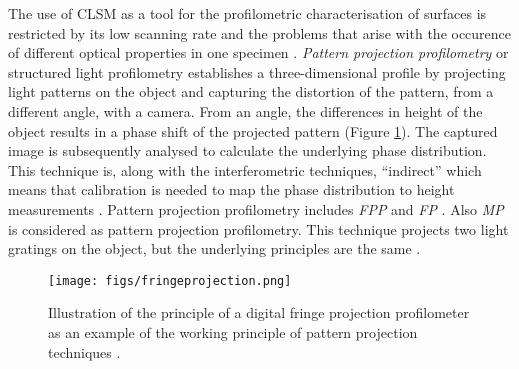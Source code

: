   The use of \gls{CLSM} as a tool for the profilometric characterisation of surfaces is restricted by its low scanning rate and the problems that arise with the occurence of different optical properties in one specimen \citep{Cha2000}.  %
\emph{Pattern projection profilometry} or structured light profilometry establishes a three-dimensional profile by projecting light patterns on the object and capturing the distortion of the pattern, from a different angle, with a camera. From an angle, the differences in height of the object results in a phase shift of the projected pattern (Figure \ref{ZHanger}). The captured image is subsequently analysed to calculate the underlying phase distribution. This technique is, along with the interferometric techniques, ``indirect'' which means that calibration is needed to map the phase distribution to height measurements \citep{Gorthi2010}. 
Pattern projection profilometry includes \emph{\gls{FPP}} \citep{Zhang2010} and \emph{\gls{FP}} \citep{Su2001}. Also \emph{\gls{MP}} is considered as pattern projection profilometry. This technique projects two light gratings on the object, but the underlying principles are the same \citep{moire}.
\begin{figure}[H]
\begin{center}
\hspace{-1.5cm}
\texttt{[image: figs/fringeprojection.png]}
\caption{Illustration of the principle of a digital fringe projection profilometer as an example of the working principle of pattern projection techniques \citep{Zhang2010}.} 
\label{ZHanger}
\end{center}
\end{figure}

